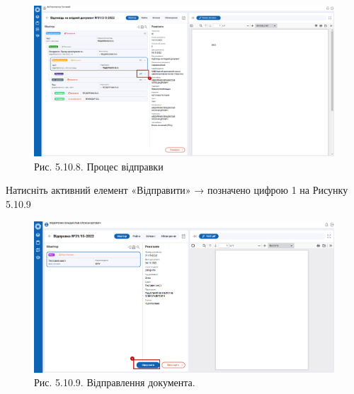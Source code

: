 \begin{figure}[!h]
\centerline{\includegraphics[width=\textwidth]{img/5.10.8.png}}
\caption{Рис. 5.10.8. Процес відправки}
\end{figure}

Натисніть активний елемент «Відправити» → позначено цифрою 1 на Рисунку 5.10.9

\begin{figure}[!h]
\centerline{\includegraphics[width=\textwidth]{img/5.10.9.png}}
\caption{Рис. 5.10.9. Відправлення документа.}
\end{figure}

\newpage